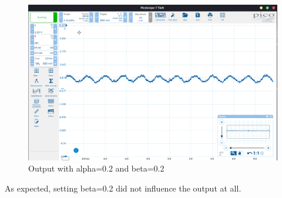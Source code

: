 \begin{figure}[H]
    \centering
    \includegraphics[width=150mm, keepaspectratio]{figures/beta.png}
    \caption{Output with alpha=0.2 and beta=0.2}
    \label{fig:beta}
\end{figure}

As expected, setting beta=0.2 did not influence the output at all.
